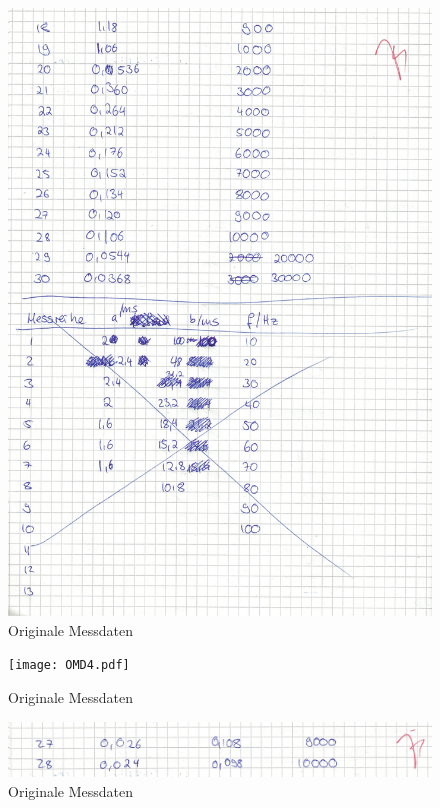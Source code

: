 \begin{figure}
  \centering
  \includegraphics[width=\textwidth]{OMD3.pdf}
  \caption{Originale Messdaten}
  \label{Messung}
\end{figure}

\begin{figure}
  \centering
  \texttt{[image: OMD4.pdf]}
  \caption{Originale Messdaten}
  \label{Messung}
\end{figure}

\begin{figure}
  \centering
  \includegraphics[width=\textwidth]{OMD5.pdf}
  \caption{Originale Messdaten}
  \label{Messung}
\end{figure}


%


\nocite{*}
\printbibliography


